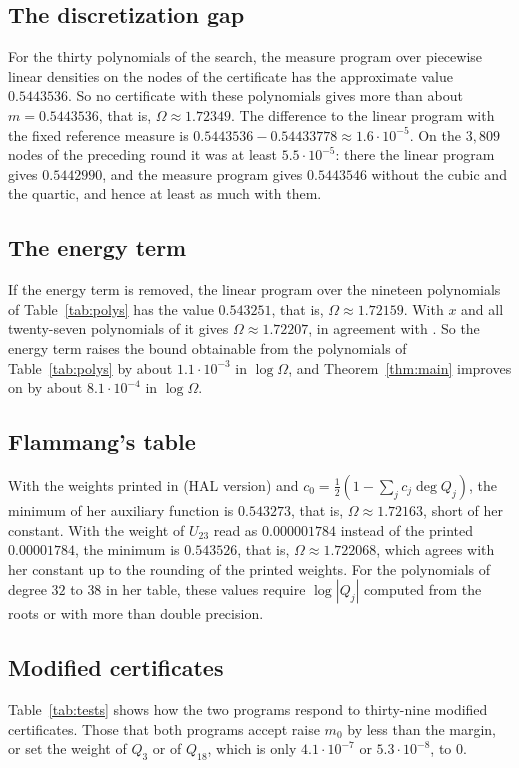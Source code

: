 \documentclass[11pt]{amsart}
\theoremstyle{remark}
\numberwithin{equation}{section}
\newcommand{\MDual}{0.54433778}
\newcommand{\PrimalVal}{0.5443536}
\newcommand{\NoEnergyVal}{0.543251}
\newcommand{\NoEnergyOmega}{1.72159}
\begin{document}
\subsection{The discretization gap}
For the thirty polynomials of the search, the measure program over piecewise linear densities on the nodes of the certificate has the approximate value $\PrimalVal$. So no certificate with these polynomials gives more than about $m=\PrimalVal$, that is, $\Omega\approx1.72349$. The difference to the linear program with the fixed reference measure is $\PrimalVal-\MDual\approx1.6\cdot10^{-5}$. On the $3{,}809$ nodes of the preceding round it was at least $5.5\cdot10^{-5}$: there the linear program gives $0.5442990$, and the measure program gives $0.5443546$ without the cubic and the quartic, and hence at least as much with them.

\subsection{The energy term}
If the energy term is removed, the linear program over the nineteen polynomials of Table~\ref{tab:polys} has the value $\NoEnergyVal$, that is, $\Omega\approx\NoEnergyOmega$. With $x$ and all twenty-seven polynomials of \cite[Table~1]{Fla15} it gives $\Omega\approx1.72207$, in agreement with \cite[Theorem~1]{Fla15}. So the energy term raises the bound obtainable from the polynomials of Table~\ref{tab:polys} by about $1.1\cdot10^{-3}$ in $\log\Omega$, and Theorem~\ref{thm:main} improves on \cite{Fla15} by about $8.1\cdot10^{-4}$ in $\log\Omega$.

\subsection{Flammang's table}\label{sec:flamtab}
With the weights printed in \cite[Table~1]{Fla15} (HAL version) and $c_0=\frac12(1-\sum_jc_j\deg Q_j)$, the minimum of her auxiliary function is $0.543273$, that is, $\Omega\approx1.72163$, short of her constant. With the weight of $U_{23}$ read as $0.000001784$ instead of the printed $0.00001784$, the minimum is $0.543526$, that is, $\Omega\approx1.722068$, which agrees with her constant up to the rounding of the printed weights. For the polynomials of degree $32$ to $38$ in her table, these values require $\log|Q_j|$ computed from the roots or with more than double precision.

\subsection{Modified certificates}
Table~\ref{tab:tests} shows how the two programs respond to thirty-nine modified certificates. Those that both programs accept raise $m_0$ by less than the margin, or set the weight of $Q_3$ or of $Q_{18}$, which is only $4.1\cdot10^{-7}$ or $5.3\cdot10^{-8}$, to $0$.
\end{document}

